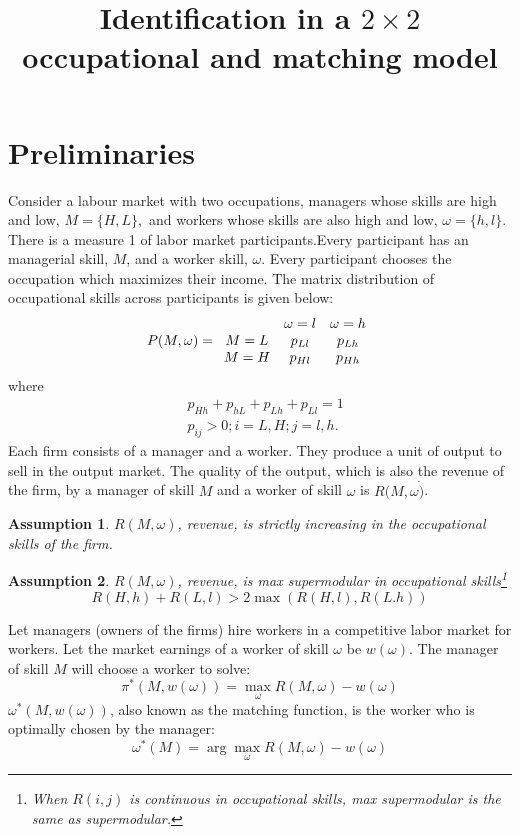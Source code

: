 \documentclass[12 pt]{article}
\title{Identification in a $2\times2$ occupational and matching
	model}
\date{}
\newtheorem{assumption}{Assumption} %
\begin{document}
	
	\maketitle
	
	\onehalfspacing
	
	\vspace{-2cm}
	
	\section{Preliminaries}
	

Consider a labour market with two occupations, managers whose skills are high and low, $M=\{H,L\},$ and workers whose skills are also high and low, $\omega=\{h,l\}$. There is a measure 1 of labor market participants.Every participant has an managerial skill, $M$, and a worker skill, $\omega$. Every participant chooses the occupation which maximizes their income. The matrix distribution of occupational skills across participants is given below:%
\[
P(M,\omega)=%
\begin{array}
	[c]{ccc}
	& \omega=l & \omega=h\\
	M=L & p_{Ll} & p_{Lh}\\
	M=H & p_{Hl} & p_{Hh}%
\end{array}
\]
where
\begin{align}
	&  p_{Hh}+p_{hL}+p_{Lh}+p_{Ll}=1\\
	& p_{ij}   >0;i=L,H;j=l,h.
\end{align}
Each firm consists of a manager and a worker. They produce a unit of output to sell in the output market. The quality of the output, which is also the revenue of the firm, by a manager of skill $M$ and a worker of skill $\omega$ is $R(M,\omega\dot{)}$.
\begin{assumption}
	$R(M,\omega)$, revenue, is strictly
	increasing in the occupational skills of the firm.
	\label{a1}
\end{assumption}
\begin{assumption}
	$R(M,\omega)$, revenue, is max supermodular
	in occupational skills\footnote{When $R(i,j)$ is continuous in occupational
	skills, max supermodular is the same as supermodular.}	
	\begin{equation}
		R(H,h)+R(L,l)>2\max(R(H,l),R(L.h))
	\end{equation}
		\label{a2}
\end{assumption}
Let managers (owners of the firms) hire workers in a competitive labor market
for workers. Let the market earnings of a worker of skill $\omega$ be
$w(\omega)$. The manager of skill $M$ will choose a worker to solve:
\begin{equation}
	\pi^{\ast}(M,w(\omega))=\max_{\omega}R(M,\omega)-w(\omega) \label{profit max}
\end{equation}
$\omega^{\ast}(M,w(\omega))$, also known as the matching function, is the
worker who is optimally chosen by the manager:
\begin{equation}
	\omega^{\ast}(M)=\arg\max_{\omega}R(M,\omega)-w(\omega) \label{worker choice}
\end{equation}
\end{document}
